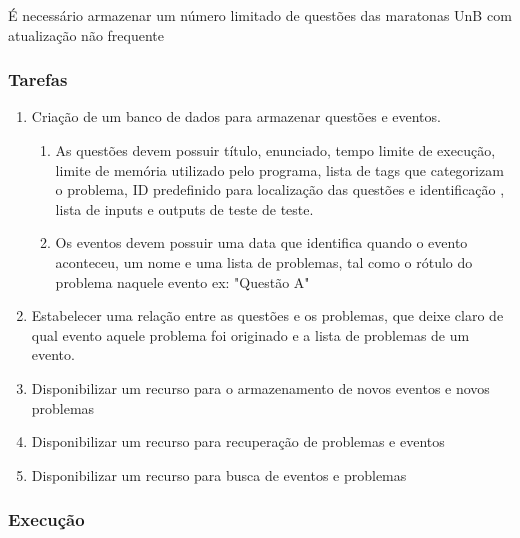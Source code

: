 É necessário armazenar um número limitado de questões das maratonas UnB com atualização não 
frequente

\subsubsection{Tarefas}

\begin{enumerate}
    \item Criação de um banco de dados para armazenar questões e eventos.
          \begin{enumerate}
              \item As questões devem possuir título, enunciado, tempo limite de execução, limite 
              de memória utilizado pelo programa, lista de tags que categorizam o problema, ID 
              predefinido para localização das questões e identificação , lista de inputs e outputs 
              de teste de teste.
              \item Os eventos devem possuir uma data que identifica quando o evento aconteceu, um 
              nome e uma lista de problemas, tal como o rótulo do problema naquele evento ex: 
              "Questão A"
          \end{enumerate}
    \item Estabelecer uma relação entre as questões e os problemas, que deixe claro de qual evento 
    aquele problema foi originado e a lista de problemas de um evento.
    \item Disponibilizar um recurso para o armazenamento de novos eventos e novos problemas
    \item Disponibilizar um recurso para recuperação de problemas e eventos
    \item Disponibilizar um recurso para busca de eventos e problemas
\end{enumerate}



\subsubsection{Execução}

